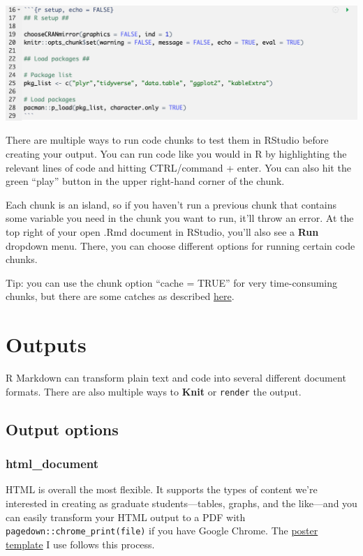 \documentclass[
]{book}
\begin{document}
\includegraphics[width=20.36in]{images/example_chunk}

There are multiple ways to run code chunks to test them in RStudio before creating your output. You can run code like you would in R by highlighting the relevant lines of code and hitting CTRL/command + enter. You can also hit the green ``play'' button in the upper right-hand corner of the chunk.

Each chunk is an island, so if you haven't run a previous chunk that contains some variable you need in the chunk you want to run, it'll throw an error. At the top right of your open .Rmd document in RStudio, you'll also see a \textbf{Run} dropdown menu. There, you can choose different options for running certain code chunks.

Tip: you can use the chunk option ``cache = TRUE'' for very time-consuming chunks, but there are some catches as described \href{https://bookdown.org/yihui/rmarkdown-cookbook/cache.html}{here}.

\hypertarget{output}{%
\chapter{Outputs}\label{output}}

R Markdown can transform plain text and code into several different document formats. There are also multiple ways to \textbf{Knit} or \texttt{render} the output.

\hypertarget{output-options}{%
\section{Output options}\label{output-options}}

\hypertarget{html_document}{%
\subsection{html\_document}\label{html_document}}

HTML is overall the most flexible. It supports the types of content we're interested in creating as graduate students---tables, graphs, and the like---and you can easily transform your HTML output to a PDF with \texttt{pagedown::chrome\_print(file)} if you have Google Chrome. The \href{https://github.com/brentthorne/posterdown}{poster template} I use follows this process.
\end{document}

